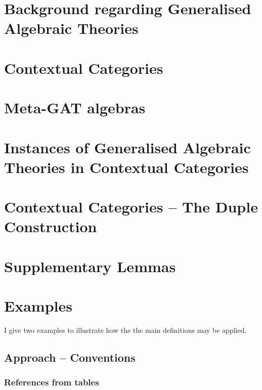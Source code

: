 \documentclass[10pt,a4paper]{article}
\theoremstyle{remark}
\begin{document}
\section{Background regarding Generalised Algebraic Theories}

\section{Contextual Categories }

\section{Meta-GAT algebras}


\section{Instances of Generalised Algebraic Theories in Contextual Categories}
\label{sectioninwhichinstanceisdefined}



\section{Contextual Categories -- The Duple Construction}
\label{contextualnotationparttwo}


\section{Supplementary Lemmas}

\section{Examples}
\label{examples}
I give two examples to illustrate how the the main definitions may be applied. 
\subsection{Approach -- Conventions}


\subsubsection{References from tables}
\end{document}
